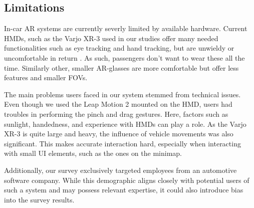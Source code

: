 

\subsection{Limitations}
In-car AR systems are currently severly limited by available hardware. Current HMDs, such as the Varjo XR-3 used in our studies offer many needed functionalities such as eye tracking and hand tracking, but are unwieldy or uncomfortable in return \cite{Goedicke2022xroom}. As such, passengers don't want to wear these all the time. Similarly other, smaller AR-glasses are more comfortable but offer less features and smaller FOVs.

The main problems users faced in our system stemmed from technical issues. Even though we used the Leap Motion 2 mounted on the HMD, users had troubles in performing the pinch and drag gestures. Here, factors such as sunlight, handedness, and experience with HMDs can play a role. As the Varjo XR-3 is quite large and heavy, the influence of vehicle movements was also significant. This makes accurate interaction hard, especially when interacting with small UI elements, such as the ones on the minimap.

Additionally, our survey exclusively targeted employees from an automotive software company. While this demographic aligns closely with potential users of such a system and may possess relevant expertise, it could also introduce bias into the survey results.
